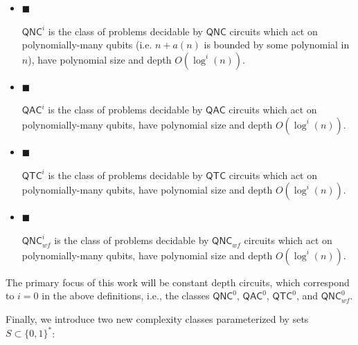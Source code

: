 \begin{itemize}


\item[] 
$\blacksquare$ 


${\mathsf{QNC}}^{i}$ is the class of problems decidable by ${\mathsf{QNC}}$ circuits which act on polynomially-many qubits (i.e. $n+a(n)$ is bounded by some polynomial in $n$), have polynomial size and depth $O(\log^{i}(n))$.\par





\item[] 
$\blacksquare$ 


${\mathsf{QAC}}^{i}$ is the class of problems decidable by ${\mathsf{QAC}}$ circuits which act on polynomially-many qubits, have polynomial size and depth $O(\log^{i}(n))$.\par





\item[] 
$\blacksquare$ 


${\mathsf{QTC}}^{i}$ is the class of problems decidable by ${\mathsf{QTC}}$ circuits which act on polynomially-many qubits, have polynomial size and depth $O(\log^{i}(n))$.\par





\item[] 
$\blacksquare$ 


${\mathsf{QNC}}^{i}_{wf}$ is the class of problems decidable by ${\mathsf{QNC}}_{wf}$ circuits which act on polynomially-many qubits, have polynomial size and depth $O(\log^{i}(n))$.\par





\end{itemize}




The primary focus of this work will be constant depth circuits, which correspond to $i=0$ in the above definitions, i.e., the classes ${\mathsf{QNC}}^{0}$, ${\mathsf{QAC}}^{0}$, ${\mathsf{QTC}}^{0}$, and ${\mathsf{QNC}}_{wf}^{0}$.\par




Finally, we introduce two new complexity classes parameterized by sets $S\subset\{0,1\}^{*}$:\par


